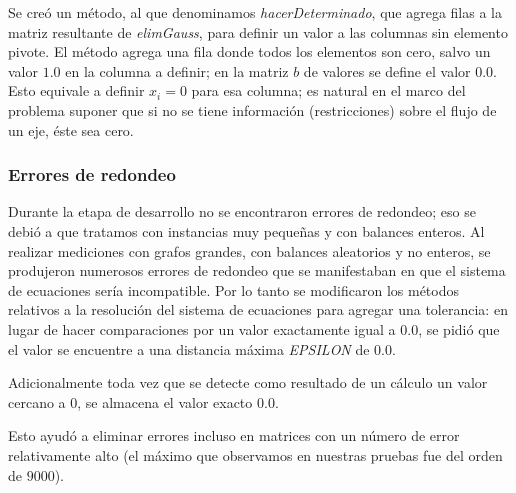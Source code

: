 Se cre\'o un m\'etodo, al que denominamos \emph{hacerDeterminado}, que agrega filas a la matriz resultante de \emph{elimGauss}, para definir un valor a las columnas sin elemento pivote. El m\'etodo agrega una fila donde todos los elementos son cero, salvo un valor $1.0$ en la columna a definir; en la matriz $b$ de valores se define el valor $0.0$. Esto equivale a definir $x_i = 0$ para esa columna; es natural en el marco del problema suponer que si no se tiene informaci\'on (restricciones) sobre el flujo de un eje, \'este sea cero.

\subsubsection{Errores de redondeo}

Durante la etapa de desarrollo no se encontraron errores de redondeo; eso se debi\'o a que tratamos con instancias muy peque\~nas y con balances enteros.
Al realizar mediciones con grafos grandes, con balances aleatorios y no enteros, se produjeron numerosos errores de redondeo que se manifestaban en que el sistema de ecuaciones ser\'ia incompatible.
Por lo tanto se modificaron los m\'etodos relativos a la resoluci\'on del sistema de ecuaciones para agregar una tolerancia: en lugar de hacer comparaciones por un valor exactamente igual a $0.0$, se pidi\'o que el valor se encuentre a una distancia m\'axima \emph{EPSILON} de $0.0$.

Adicionalmente toda vez que se detecte como resultado de un c\'alculo un valor cercano a $0$, se almacena el valor exacto $0.0$.

Esto ayud\'o a eliminar errores incluso en matrices con un n\'umero de error relativamente alto (el m\'aximo que observamos en nuestras pruebas fue del orden de $9000$).

